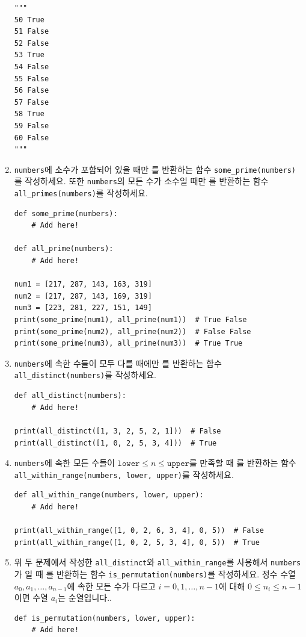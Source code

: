 \documentclass[../main.tex]{subfiles}
\begin{document}
\begin{enumerate}
\begin{verbatim}
"""
50 True
51 False
52 False
53 True
54 False
55 False
56 False
57 False
58 True
59 False
60 False
"""
\end{verbatim}

\item \verb/numbers/에 소수가 포함되어 있을 때만 를 반환하는 함수 \texttt{some\_prime(numbers)}를 작성하세요.
  또한 \verb/numbers/의 모든 수가 소수일 때만 를 반환하는 함수 \texttt{all\_primes(numbers)}를 작성하세요.
\begin{verbatim}
def some_prime(numbers):
    # Add here!

def all_prime(numbers):
    # Add here!

num1 = [217, 287, 143, 163, 319]
num2 = [217, 287, 143, 169, 319]
num3 = [223, 281, 227, 151, 149]
print(some_prime(num1), all_prime(num1))  # True False
print(some_prime(num2), all_prime(num2))  # False False
print(some_prime(num3), all_prime(num3))  # True True
\end{verbatim}

\item \verb/numbers/에 속한 수들이 모두 다를 때에만 를 반환하는 함수 \texttt{all\_distinct(numbers)}를 작성하세요.
\begin{verbatim}
def all_distinct(numbers):
    # Add here!

print(all_distinct([1, 3, 2, 5, 2, 1]))  # False
print(all_distinct([1, 0, 2, 5, 3, 4]))  # True
\end{verbatim}

\item \verb/numbers/에 속한 모든 수들이 $\texttt{lower} \leq n \leq \texttt{upper}$를 만족할 때 를 반환하는 함수 \texttt{all\_within\_range(numbers, lower, upper)}를 작성하세요.
\begin{verbatim}
def all_within_range(numbers, lower, upper):
    # Add here!

print(all_within_range([1, 0, 2, 6, 3, 4], 0, 5))  # False
print(all_within_range([1, 0, 2, 5, 3, 4], 0, 5))  # True
\end{verbatim}

\item 위 두 문제에서 작성한 \verb/all_distinct/와 \verb/all_within_range/를 사용해서 \verb/numbers/가 일 때 를 반환하는 함수 \texttt{is\_permutation(numbers)}를 작성하세요.
정수 수열 $a_0, a_1, \dots, a_{n - 1}$에 속한 모든 수가 다르고 $i = 0, 1, \dots, n - 1$에 대해 $0 \leq n_i \leq n - 1$이면 수열 $a_i$는 순열입니다..
\begin{verbatim}
def is_permutation(numbers, lower, upper):
    # Add here!


\end{verbatim}
\end{enumerate}
\end{document}

